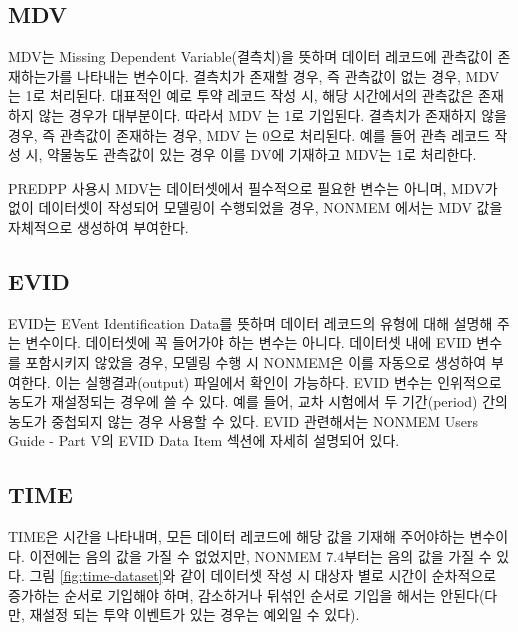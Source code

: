 \documentclass[
  11pt,
  krantz2,
  a4paper]{krantz}
\theoremstyle{definition}
\theoremstyle{definition}
\theoremstyle{definition}
\theoremstyle{remark}
\begin{document}
\hypertarget{mdv}{%
\subsection{MDV}\label{mdv}}


MDV는 Missing Dependent Variable(결측치)을 뜻하며 데이터 레코드에 관측값이 존재하는가를 나타내는 변수이다. 결측치가 존재할 경우, 즉 관측값이 없는 경우, MDV 는 1로 처리된다. 대표적인 예로 투약 레코드 작성 시, 해당 시간에서의 관측값은 존재하지 않는 경우가 대부분이다. 따라서 MDV 는 1로 기입된다. 결측치가 존재하지 않을 경우, 즉 관측값이 존재하는 경우, MDV 는 0으로 처리된다. 예를 들어 관측 레코드 작성 시, 약물농도 관측값이 있는 경우 이를 DV에 기재하고 MDV는 1로 처리한다.

PREDPP 사용시 MDV는 데이터셋에서 필수적으로 필요한 변수는 아니며, MDV가 없이 데이터셋이 작성되어 모델링이 수행되었을 경우, NONMEM 에서는 MDV 값을 자체적으로 생성하여 부여한다.

\hypertarget{evid}{%
\subsection{EVID}\label{evid}}


EVID는 EVent Identification Data를 뜻하며 데이터 레코드의 유형에 대해 설명해 주는 변수이다. 데이터셋에 꼭 들어가야 하는 변수는 아니다. 데이터셋 내에 EVID 변수를 포함시키지 않았을 경우, 모델링 수행 시 NONMEM은 이를 자동으로 생성하여 부여한다. 이는 실행결과(output) 파일에서 확인이 가능하다. EVID 변수는 인위적으로 농도가 재설정되는 경우에 쓸 수 있다. 예를 들어, 교차 시험에서 두 기간(period) 간의 농도가 중첩되지 않는 경우 사용할 수 있다. EVID 관련해서는 NONMEM Users Guide - Part V의 EVID Data Item 섹션에 자세히 설명되어 있다.

\hypertarget{time}{%
\subsection{TIME}\label{time}}


TIME은 시간을 나타내며, 모든 데이터 레코드에 해당 값을 기재해 주어야하는 변수이다. 이전에는 음의 값을 가질 수 없었지만, NONMEM 7.4부터는 음의 값을 가질 수 있다. 그림 \ref{fig:time-dataset}와 같이 데이터셋 작성 시 대상자 별로 시간이 순차적으로 증가하는 순서로 기입해야 하며, 감소하거나 뒤섞인 순서로 기입을 해서는 안된다(다만, 재설정 되는 투약 이벤트가 있는 경우는 예외일 수 있다).
\end{document}
